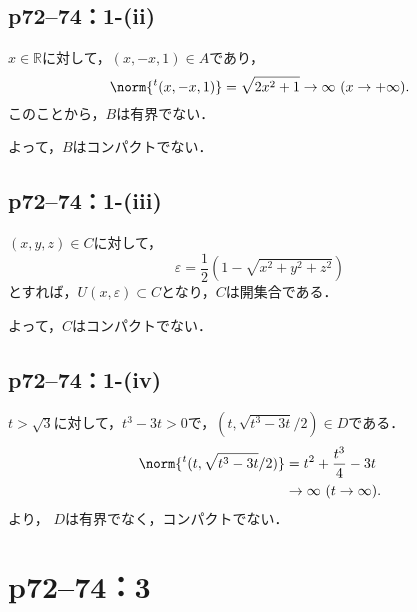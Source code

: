 \documentclass[a4paper,10pt,fleqn]{ltjsarticle}
\begin{document}
\subsection*{p72--74：1-(ii)}

\begin{tleftbar}
    $ x \in \mathbb{R}$に対して，$ (x,-x,1) \in A$であり，
    \[
        \norm{{}^t (x,-x,1)}=\sqrt{2x^2+1} \to \infty ~(x \to +\infty).
    \]
    このことから，$B$は有界でない．

    よって，$B$はコンパクトでない．
\end{tleftbar}


\subsection*{p72--74：1-(iii)}

\begin{tleftbar}
    $(x,y,z) \in C$に対して，
    \[
        \varepsilon =\frac{1}{2}(1-\sqrt{x^2+y^2+z^2})
    \]
    とすれば，$U(x,\varepsilon)\subset C$となり，$C$は開集合である．

    よって，$C$はコンパクトでない．
\end{tleftbar}



\subsection*{p72--74：1-(iv)}

\begin{tleftbar}
    $t>\sqrt{3}$に対して，$t^3 -3t >0$で，$(t,\sqrt{t^3-3t}/2) \in D$である．
    \begin{align*}
        \norm{{}^t (t,\sqrt{t^3-3t}/2)} & = t^2 + \frac{t^3}{4}-3t     \\
                                        & \to  \infty ~(t \to \infty).
    \end{align*}
    より， $D$は有界でなく，コンパクトでない．
\end{tleftbar}

\newpage
\section*{p72--74：3}
\end{document}
